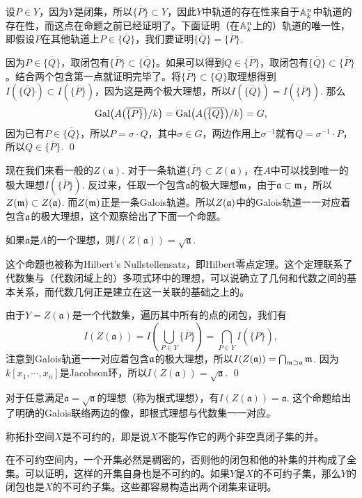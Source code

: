 \proof 设$P\in Y$，因为$Y$是闭集，所以$\overline{\{P\}}\subset Y$，因此$Y$中轨道的存在性来自于$\mathbb{A}^n_k$中轨道的存在性，而这点在命题之前已经证明了。下面证明（在$\mathbb{A}^n_k$上的）轨道的唯一性，即假设$P$在其他轨道上$P\in \overline{\{Q\}}$，我们要证明$\overline{\{Q\}}=\overline{\{P\}}$.

因为$P\in \overline{\{Q\}}$，取闭包有$\overline{\{P\}}\subset \overline{\{Q\}}$。如果可以得到$Q\in \overline{\{P\}}$，取闭包有$\overline{\{Q\}}\subset \overline{\{P\}}$。结合两个包含第一点就证明完毕了。将$\overline{\{P\}}\subset \overline{\{Q\}}$取理想得到$I(\overline{\{Q\}})\subset I(\overline{\{P\}})$，因为这是两个极大理想，所以$I(\overline{\{Q\}})=I(\overline{\{P\}})$. 那么
\[
	\operatorname{Gal}\bigl(A\bigl(\overline{\{P\}}\bigr)/k\bigr)=\operatorname{Gal}\bigl(A\bigl(\overline{\{Q\}}\bigr)/k\bigr)=G,
\]
因为已有$P\in \overline{\{Q\}}$，所以$P=\sigma \cdot Q$，其中$\sigma\in G$，两边作用上$\sigma^{-1}$就有$Q=\sigma^{-1}\cdot P$，所以$Q\in \overline{\{P\}}$. \qed

\para 现在我们来看一般的$Z(\mathfrak{a})$. 对于一条轨道$\overline{\{P\}}\subset Z(\mathfrak{a})$，在$A$中可以找到唯一的极大理想$I(\overline{\{P\}})$. 反过来，任取一个包含$\mathfrak{a}$的极大理想$\mathfrak{m}$，由于$\mathfrak{a}\subset \mathfrak{m}$，所以$Z(\mathfrak{m})\subset Z(\mathfrak{a})$. 而$Z(\mathfrak{m})$正是一条Galois轨道。所以$Z(\mathfrak{a})$中的Galois轨道一一对应着包含$\mathfrak{a}$的极大理想，这个观察给出了下面一个命题。

\pro 如果$\mathfrak{a}$是$A$的一个理想，则$I(Z(\mathfrak{a}))=\sqrt{\mathfrak{a}}$.

这个命题也被称为Hilbert's Nullstellensatz，即Hilbert零点定理。这个定理联系了代数集与（代数闭域上的）多项式环中的理想，可以说确立了几何和代数之间的基本关系，而代数几何正是建立在这一关联的基础之上的。

\proof 由于$Y=Z(\mathfrak{a})$是一个代数集，遍历其中所有的点的闭包，我们有
\[
	I(Z(\mathfrak{a}))=I\left(\bigcup_{P\in Y}\overline{\{P\}}\right)=\bigcap_{P\in Y}I\left(\overline{\{P\}}\right),
\]
注意到Galois轨道一一对应着包含$\mathfrak{a}$的极大理想，所以$I(Z(\mathfrak{a}))=\bigcap_{\mathfrak{m}\supset \mathfrak{a}}\mathfrak{m}$. 因为$k[x_1,\cdots,x_n]$是Jacobson环，所以$I(Z(\mathfrak{a}))=\sqrt{\mathfrak{a}}$. \qed

对于任意满足$\mathfrak{a}=\sqrt{\mathfrak{a}}$的理想（称为根式理想），有$I(Z(\mathfrak{a}))=\mathfrak{a}$. 这个命题给出了明确的Galois联络两边的像，即根式理想与代数集一一对应。

\para 称拓扑空间$X$是不可约的，即是说$X$不能写作它的两个非空真闭子集的并。

在不可约空间内，一个开集必然是稠密的，否则他的闭包和他的补集的并构成了全集。可以证明，这样的开集自身也是不可约的。如果$Y$是$X$的不可约子集，那么$Y$的闭包也是$X$的不可约子集。这些都容易构造出两个闭集来证明。
 
